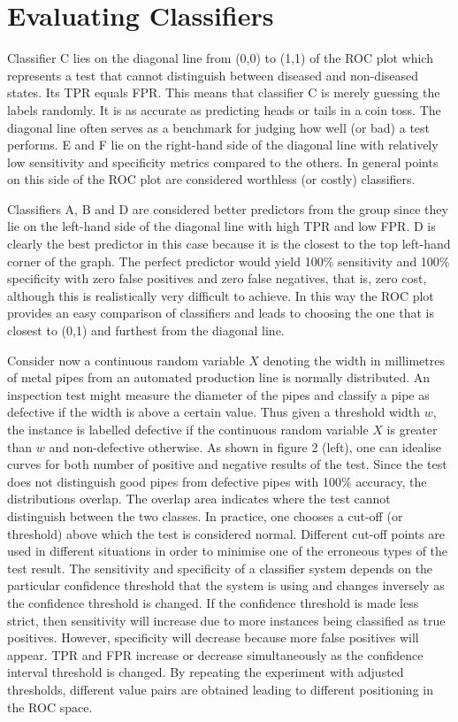 \section{Evaluating Classifiers} 
Classifier C lies on the diagonal line from (0,0) to (1,1) of the ROC plot which represents a test that cannot distinguish between diseased and non-diseased states. Its TPR equals FPR. This means that classifier C is merely guessing the labels randomly. It is as accurate as predicting heads or tails in a coin toss. The diagonal line often serves as a benchmark for judging how well (or bad) a test performs. E and F lie on the right-hand side of the diagonal line with relatively low sensitivity and specificity metrics compared to the others. In general points on this side of the ROC plot are considered worthless (or costly) classifiers.

Classifiers A, B and D are considered better predictors from the group since they lie on the left-hand side of the diagonal line with high TPR and low FPR. D is clearly the best predictor in this case because it is the closest to the top left-hand corner of the graph. The perfect predictor would yield 100\% sensitivity and 100\% specificity with zero false positives and zero false negatives, that is, zero cost, although this is realistically very difficult to achieve. In this way the ROC plot provides an easy comparison of classifiers and leads to choosing the one that is closest to (0,1) and furthest from the diagonal line.

Consider now a continuous random variable $X$ denoting the width in millimetres of metal pipes from an automated production line is normally distributed. An inspection test might measure the diameter of the pipes and classify a pipe as defective if the width is above a certain value. Thus given a threshold width $w$, the instance is labelled defective if the continuous random variable $X$ is greater than $w$ and non-defective otherwise. As shown in figure 2 (left), one can idealise curves for both number of positive and negative results of the test. Since the test does not distinguish good pipes from defective pipes with 100\% accuracy, the distributions overlap. The overlap area indicates where the test cannot distinguish between the two classes. In practice, one chooses a cut-off (or threshold) above which the test is considered normal. Different cut-off points are used in different situations in order to minimise one of the erroneous types of the test result. The sensitivity and specificity of a classifier system depends on the particular confidence threshold that the system is using and changes inversely as the confidence threshold is changed. If the confidence threshold is made less strict, then sensitivity will increase due to more instances being classified as true positives. However, specificity will decrease because more false positives will appear. TPR and FPR increase or decrease simultaneously as the confidence interval threshold is changed. By repeating the experiment with adjusted thresholds, different value pairs are obtained leading to different positioning in the ROC space. 

